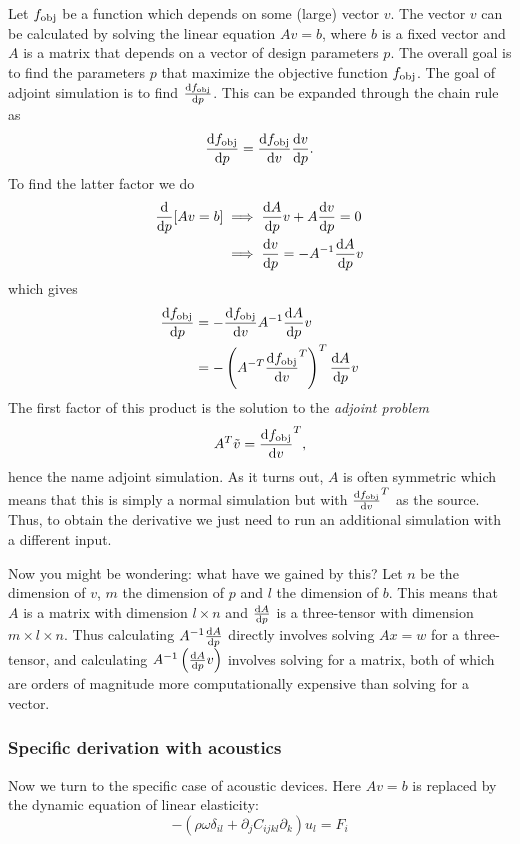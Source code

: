 Let $f_\text{obj}$ be a function which depends on some (large) vector $v$.
The vector $v$ can be calculated by solving the linear equation
$A v = b$, where $b$ is a fixed vector and $A$ is a matrix that depends on a
vector of design parameters $p$.
The overall goal is to find the parameters $p$ that maximize the objective
function $f_\text{obj}$.
The goal of adjoint simulation is to find $\diff{\fobj}{p}$.
This can be expanded through the chain rule as
\[
	\diff{\fobj}{p} = \diff{\fobj}{v} \diff{v}{p}.
\]
To find the latter factor we do
\begin{align*}
	\diff{}{p} [Av = b] &\implies \diff{A}{p} v + A \diff{v}{p} = 0\\
						&\implies \diff{v}{p} = -A^{-1} \diff{A}{p} v
\end{align*}
which gives
\begin{align}
	\diff{\fobj}{p} &= - \diff{\fobj}{v} A^{-1} \diff{A}{p}
	v\label{eq:no_adj_sim}\\
	&= - \left(A^{-T} \diff{\fobj}{v}^T \right)^T \diff{A}{p} v
\end{align}
The first factor of this product is the solution to the \emph{adjoint problem}
\begin{equation}
	A^T \tilde v = \diff{\fobj}{v}^T,
\end{equation}
hence the name adjoint simulation.
As it turns out, $A$ is often symmetric which means that this is simply a normal
simulation but with $\diff{\fobj}{v}^T$ as the source.
Thus, to obtain the derivative we just need to run an additional
simulation with a different input.

Now you might be wondering: what have we gained by this?
Let $n$ be the dimension of $v$, $m$ the dimension of $p$ and $l$ the dimension
of $b$.
This means that $A$ is a matrix with dimension $l\times n$ and $\diff{A}{p}$ is
a three-tensor with dimension $m\times l\times n$.
Thus calculating $A^{-1} \diff{A}{p}$ directly involves solving $Ax = w$ for a
three-tensor, and calculating $A^{-1} \left(\diff{A}{p} v\right)$
involves solving for a matrix, both of which are orders of magnitude more
computationally expensive than solving for a vector.

\subsubsection{Specific derivation with acoustics}

Now we turn to the specific case of acoustic devices.
Here $A v = b$ is replaced by the dynamic equation  of linear elasticity:
\begin{equation}
	-\left(\rho \omega \delta_{il} + \partial_j C_{ijkl} \partial_k\right) u_l =
	F_i
\end{equation}

